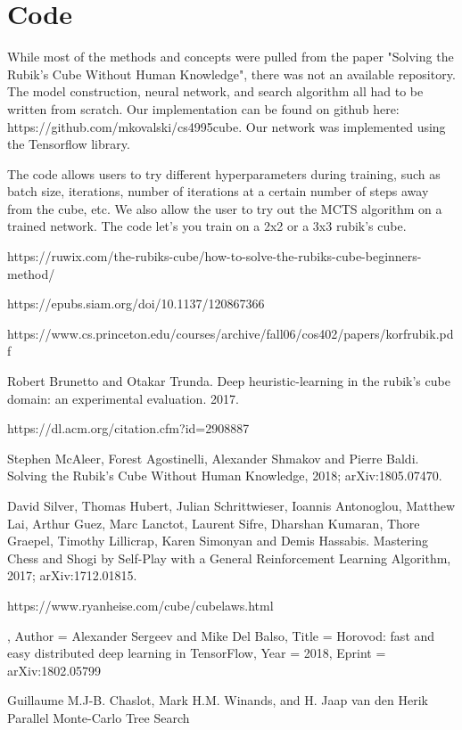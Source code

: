 \documentclass[10pt,twocolumn,letterpaper]{article}
\begin{document}
\section{Code}

While most of the methods and concepts were pulled from the paper "Solving the Rubik’s Cube Without Human Knowledge", there was not an available repository.  The model construction, neural network, and search algorithm all had to be written from scratch.  Our implementation can be found on github here: https://github.com/mkovalski/cs4995\textunderscore cube.  Our network was implemented using the Tensorflow library. 

The code allows users to try different hyperparameters during training, such as batch size, iterations, number of iterations at a certain number of steps away from the cube, etc.   We also allow the user to try out the MCTS algorithm on a trained network. The code let's you train on a 2x2 or a 3x3 rubik's cube. 




\begin{thebibliography}{9}

\bibitem{}
https://ruwix.com/the-rubiks-cube/how-to-solve-the-rubiks-cube-beginners-method/

\bibitem{}
https://epubs.siam.org/doi/10.1137/120867366

\bibitem{}
https://www.cs.princeton.edu/courses/archive/fall06/cos402/papers/korfrubik.pdf

\bibitem{}
Robert Brunetto and Otakar Trunda. Deep heuristic-learning in the rubik’s cube domain: an experimental evaluation. 2017.

\bibitem{}
https://dl.acm.org/citation.cfm?id=2908887

Stephen McAleer, Forest Agostinelli, Alexander Shmakov and Pierre Baldi.
\newblock Solving the Rubik's Cube Without Human Knowledge, 2018;
\newblock arXiv:1805.07470.

David Silver, Thomas Hubert, Julian Schrittwieser, Ioannis Antonoglou, Matthew Lai, Arthur Guez, Marc Lanctot, Laurent Sifre, Dharshan Kumaran, Thore Graepel, Timothy Lillicrap, Karen Simonyan and Demis Hassabis.
\newblock Mastering Chess and Shogi by Self-Play with a General Reinforcement Learning Algorithm, 2017;
\newblock arXiv:1712.01815.

\bibitem{}
https://www.ryanheise.com/cube/cube\textunderscore laws.html

,
Author = {Alexander Sergeev and Mike Del Balso},
Title = {Horovod: fast and easy distributed deep learning in TensorFlow},
Year = {2018},
Eprint = {arXiv:1802.05799}

\bibitem{}
\newblock Guillaume M.J-B. Chaslot, Mark H.M. Winands, and H. Jaap van den Herik
\newblock Parallel Monte-Carlo Tree Search

\end{thebibliography}

{\small


}
\end{document}

